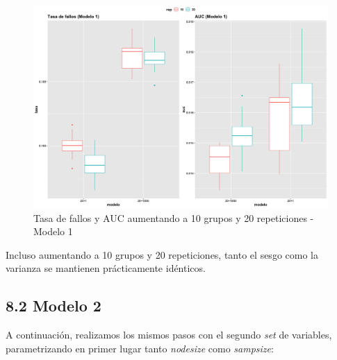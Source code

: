 \documentclass[
]{article}
\begin{document}
\begin{figure}[h!]

{\centering \includegraphics[width=0.99\linewidth,height=0.99\textheight,]{./charts/random_forest/04_comp_tasa_auc_modelo1_10_folds} 

}

\caption{Tasa de fallos y AUC aumentando a 10 grupos y 20 repeticiones - Modelo 1}\label{fig:unnamed-chunk-94}
\end{figure}

Incluso aumentando a 10 grupos y 20 repeticiones, tanto el sesgo como la
varianza se mantienen prácticamente idénticos.

\hypertarget{modelo-2-2}{%
\subsection{8.2 Modelo 2}\label{modelo-2-2}}

A continuación, realizamos los mismos pasos con el segundo \emph{set} de
variables, parametrizando en primer lugar tanto \emph{nodesize} como
\emph{sampsize}:
\end{document}
